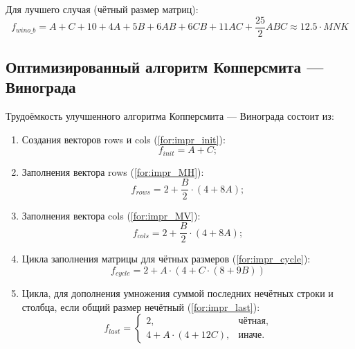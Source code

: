 Для лучшего случая (чётный размер матриц): 
\begin{equation}
	\label{for:good}
	f_{wino\_b} = A + C + 10 + 4A + 5B + 6AB + 6CB + 11AC + \frac{25}{2}ABC \approx 12.5 \cdot MNK
\end{equation}

\subsection{Оптимизированный алгоритм Копперсмита — Винограда}

Трудоёмкость улучшенного алгоритма Копперсмита — Винограда состоит из:
\begin{enumerate}
	\item Создания векторов rows и cols (\ref{for:impr_init}):
	\begin{equation}
		\label{for:impr_init}
		f_{init} = A + C;
	\end{equation}
	
	\item Заполнения вектора rows (\ref{for:impr_MH}):
	\begin{equation}
		\label{for:impr_MH}
		f_{rows} = 2 + \frac{B}{2} \cdot (4 + 8A);
	\end{equation}
	
	\item Заполнения вектора cols (\ref{for:impr_MV}):
	\begin{equation}
		\label{for:impr_MV}
		f_{cols} = 2 + \frac{B}{2} \cdot (4 + 8A);
	\end{equation}
	
	\item Цикла заполнения матрицы для чётных размеров (\ref{for:impr_cycle}):
	\begin{equation}
		\label{for:impr_cycle}
		f_{cycle} = 2 + A \cdot (4 + C \cdot (8 + 9B))
	\end{equation}
	
	\item Цикла, для дополнения умножения суммой последних нечётных строки и столбца, если общий размер нечётный (\ref{for:impr_last}):
	\begin{equation}
		\label{for:impr_last}
		f_{last} = 
		\begin{cases}
			2, & \text{чётная,}\\
			4 + A \cdot (4 + 12C), & \text{иначе.}
		\end{cases}
	\end{equation}
\end{enumerate}

